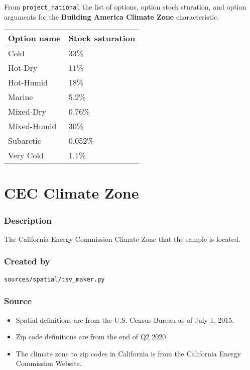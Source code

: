 From \texttt{project\_national} the list of options, option stock
sturation, and option arguments for the \textbf{Building America Climate
Zone} characteristic.

\begin{longtable}[]{@{}ll@{}}
\toprule\noalign{}
Option name & Stock saturation \\
\midrule\noalign{}
\endhead
\bottomrule\noalign{}
\endlastfoot
Cold & 33\% \\
Hot-Dry & 11\% \\
Hot-Humid & 18\% \\
Marine & 5.2\% \\
Mixed-Dry & 0.76\% \\
Mixed-Humid & 30\% \\
Subarctic & 0.052\% \\
Very Cold & 1.1\% \\
\end{longtable}

\section{CEC Climate Zone}\label{cec_climate_zone}

\subsubsection{Description}\label{description-9}

The California Energy Commission Climate Zone that the sample is
located.

\subsubsection{Created by}\label{created-by-9}

\texttt{sources/spatial/tsv\_maker.py}

\subsubsection{Source}\label{source-9}

\begin{itemize}
 
\item
  Spatial definitions are from the U.S. Census Bureau as of July 1,
  2015.
\item
  Zip code definitions are from the end of Q2 2020
\item
  The climate zone to zip codes in California is from the California
  Energy Commission Website.
\end{itemize}

